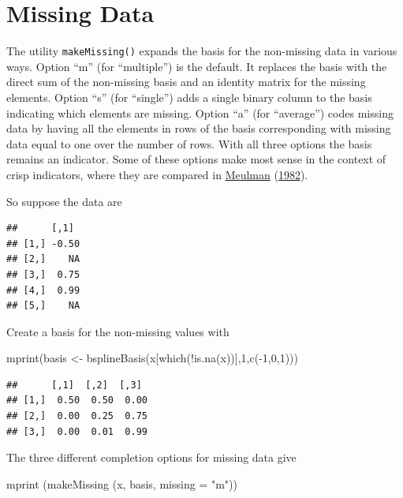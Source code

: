 \documentclass[
  12pt,
]{book}
\newenvironment{Shaded}{\begin{snugshade}}{\end{snugshade}}
\newcommand{\AttributeTok}[1]{\textcolor[rgb]{0.77,0.63,0.00}{#1}}
\newcommand{\DecValTok}[1]{\textcolor[rgb]{0.00,0.00,0.81}{#1}}
\newcommand{\FunctionTok}[1]{\textcolor[rgb]{0.00,0.00,0.00}{#1}}
\newcommand{\NormalTok}[1]{#1}
\newcommand{\OtherTok}[1]{\textcolor[rgb]{0.56,0.35,0.01}{#1}}
\newcommand{\SpecialCharTok}[1]{\textcolor[rgb]{0.00,0.00,0.00}{#1}}
\newcommand{\StringTok}[1]{\textcolor[rgb]{0.31,0.60,0.02}{#1}}
\begin{document}
\hypertarget{missing-data}{%
\section{Missing Data}\label{missing-data}}

The utility \texttt{makeMissing()} expands the basis for the non-missing data in various ways. Option ``m'' (for ``multiple'') is the default. It replaces the basis with the direct sum of the non-missing basis and an identity matrix for the missing elements. Option ``s'' (for ``single'') adds a single binary column to the basis indicating which elements are missing. Option ``a'' (for ``average'') codes missing data by having all the elements in rows of the basis corresponding with missing data equal to one over the number of rows. With all three options the basis remains an indicator. Some of these options make most sense in the context of crisp indicators, where they are compared in \protect\hyperlink{ref-meulman_82}{Meulman} (\protect\hyperlink{ref-meulman_82}{1982}).

So suppose the data are

\begin{verbatim}
##      [,1] 
## [1,] -0.50
## [2,]    NA
## [3,]  0.75
## [4,]  0.99
## [5,]    NA
\end{verbatim}

Create a basis for the non-missing values with

\begin{Shaded}
\begin{Highlighting}[]
\FunctionTok{mprint}\NormalTok{(basis }\OtherTok{\textless{}{-}} \FunctionTok{bsplineBasis}\NormalTok{(x[}\FunctionTok{which}\NormalTok{(}\SpecialCharTok{!}\FunctionTok{is.na}\NormalTok{(x))],}\DecValTok{1}\NormalTok{,}\FunctionTok{c}\NormalTok{(}\SpecialCharTok{{-}}\DecValTok{1}\NormalTok{,}\DecValTok{0}\NormalTok{,}\DecValTok{1}\NormalTok{)))}
\end{Highlighting}
\end{Shaded}

\begin{verbatim}
##      [,1]  [,2]  [,3] 
## [1,]  0.50  0.50  0.00
## [2,]  0.00  0.25  0.75
## [3,]  0.00  0.01  0.99
\end{verbatim}

The three different completion options for missing data give

\begin{Shaded}
\begin{Highlighting}[]
\FunctionTok{mprint}\NormalTok{ (}\FunctionTok{makeMissing}\NormalTok{ (x, basis, }\AttributeTok{missing =} \StringTok{"m"}\NormalTok{))}
\end{Highlighting}
\end{Shaded}
\end{document}
